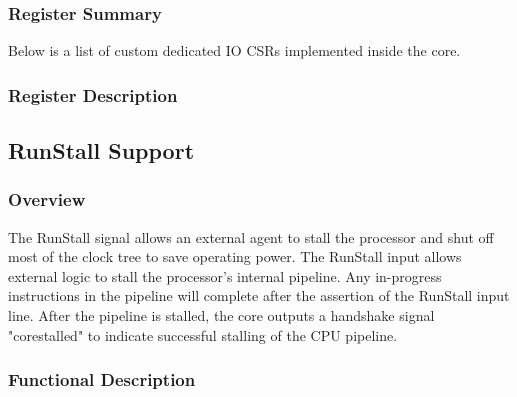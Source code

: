 \documentclass[main\_\_EN.tex]{subfiles}
\begin{document}
\subsubsection{Register Summary}
\label{sec:riscvcpu-fastio-reg-summ}


Below is a list of custom dedicated IO CSRs implemented inside the core.




\subsubsection{Register Description}
\label{sec:riscvcpu-fastio-reg-desc}



\newpage
\subsection{RunStall Support}
\label{sec:riscvcpu-custom-runstall}
\subsubsection{Overview}
\label{sec:riscvcpu-custom-runstall-overview}

The RunStall signal allows an external agent to stall the processor and shut off most of the clock tree to save operating power.
The RunStall input allows external logic to stall the processor's internal pipeline. Any in-progress instructions in the pipeline will complete after the assertion of the RunStall input line. After the pipeline is stalled, the core outputs a handshake signal "corestalled" to indicate successful stalling of the CPU pipeline.


\subsubsection{Functional Description}
\label{sec:riscvcpu-custom-runstall-feature-func-descr}
\end{document}
